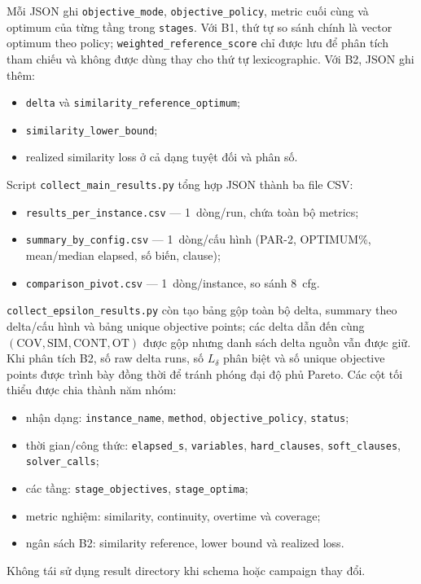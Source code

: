 \documentclass[12pt,a4paper]{article}
\newcommand{\SIM}{\mathrm{SIM}}
\newcommand{\CONT}{\mathrm{CONT}}
\newcommand{\OT}{\mathrm{OT}}
\newcommand{\COV}{\mathrm{COV}}
\begin{document}
Mỗi JSON ghi \texttt{objective\_mode}, \texttt{objective\_policy}, metric cuối
cùng và optimum của từng tầng trong \texttt{stages}. Với B1, thứ tự so sánh
chính là vector optimum theo policy; \texttt{weighted\_reference\_score} chỉ
được lưu để phân tích tham chiếu và không được dùng thay cho thứ tự
lexicographic. Với B2, JSON ghi thêm:
\begin{itemize}[nosep]
  \item \texttt{delta} và \texttt{similarity\_reference\_optimum};
  \item \texttt{similarity\_lower\_bound};
  \item realized similarity loss ở cả dạng tuyệt đối và phân số.
\end{itemize}
Script \texttt{collect\_main\_results.py} tổng hợp JSON thành ba file CSV:
\begin{itemize}
  \item \texttt{results\_per\_instance.csv} --- 1~dòng/run, chứa toàn bộ metrics;
  \item \texttt{summary\_by\_config.csv} --- 1~dòng/cấu hình
        (PAR-2, OPTIMUM\%, mean/median elapsed, số biến, clause);
  \item \texttt{comparison\_pivot.csv} --- 1~dòng/instance, so sánh 8~cfg.
\end{itemize}
\texttt{collect\_epsilon\_results.py} còn tạo bảng gộp toàn bộ delta, summary
theo delta/cấu hình và bảng unique objective points; các delta dẫn đến cùng
$(\COV,\SIM,\CONT,\OT)$ được gộp nhưng danh sách delta nguồn vẫn được giữ.
Khi phân tích B2, số raw delta runs, số $L_\delta$ phân biệt và số unique
objective points được trình bày đồng thời để tránh phóng đại độ phủ Pareto.
Các cột tối thiểu được chia thành năm nhóm:
\begin{itemize}[nosep]
  \item nhận dạng: \texttt{instance\_name}, \texttt{method},
        \texttt{objective\_policy}, \texttt{status};
  \item thời gian/công thức: \texttt{elapsed\_s}, \texttt{variables},
        \texttt{hard\_clauses}, \texttt{soft\_clauses}, \texttt{solver\_calls};
  \item các tầng: \texttt{stage\_objectives}, \texttt{stage\_optima};
  \item metric nghiệm: similarity, continuity, overtime và coverage;
  \item ngân sách B2: similarity reference, lower bound và realized loss.
\end{itemize}
Không tái sử dụng result directory khi schema hoặc campaign thay đổi.
\end{document}
